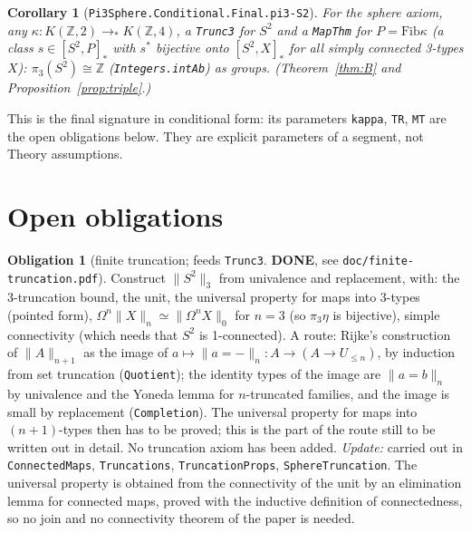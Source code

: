\documentclass[11pt]{amsart}
\newtheorem{corollary}[theorem]{Corollary}
\theoremstyle{definition}
\newtheorem{obligation}[theorem]{Obligation}
\theoremstyle{remark}
\newcommand{\Om}{\Omega}
\newcommand{\Fib}{\mathrm{Fib}}
\newcommand{\Z}{\mathbb{Z}}
\newcommand{\tr}[2]{\|#1\|_{#2}}
\newcommand{\hc}[2]{[#1,#2]_*}
\newcommand{\code}[1]{\texttt{#1}}
\begin{document}
\begin{corollary}[\code{Pi3Sphere.Conditional.Final.pi3-S2}]
For the sphere axiom, any $\kappa:K(\Z,2)\to_*K(\Z,4)$, a \code{Trunc3}
for $S^2$ and a \code{MapThm} for $P=\Fib\kappa$ (a class
$s\in\hc{S^2}P$ with $s^*$ bijective onto $\hc{S^2}X$ for all simply
connected 3-types $X$): $\pi_3(S^2)\cong\Z$ (\code{Integers.intAb}) as
groups. (Theorem~\ref{thm:B} and Proposition~\ref{prop:triple}.)
\end{corollary}

This is the final signature in conditional form: its parameters
\code{kappa}, \code{TR}, \code{MT} are the open obligations below. They
are explicit parameters of a segment, not Theory assumptions.

\section{Open obligations}\label{sec:open}

\begin{obligation}[finite truncation; feeds \code{Trunc3}. \textbf{DONE}, see \code{doc/finite-truncation.pdf}]
Construct $\tr{S^2}3$ from univalence and replacement, with: the
3-truncation bound, the unit, the universal property for maps into
3-types (pointed form), $\Om^n\tr X{n}\simeq\tr{\Om^nX}0$ for $n=3$ (so
$\pi_3\eta$ is bijective), simple connectivity (which needs that $S^2$ is
1-connected). A route: Rijke's construction of $\tr A{n+1}$ as the image of
$a\mapsto\tr{a=-}n:A\to(A\to U_{\le n})$, by induction from set
truncation (\code{Quotient}); the identity types of the image are
$\tr{a=b}n$ by univalence and the Yoneda lemma for $n$-truncated
families, and the image is small by replacement (\code{Completion}). The
universal property for maps into $(n+1)$-types then has to be proved;
this is the part of the route still to be written out in detail. No
truncation axiom has been added. \emph{Update:} carried out in
\code{ConnectedMaps}, \code{Truncations}, \code{TruncationProps},
\code{SphereTruncation}. The universal property is obtained from the
connectivity of the unit by an elimination lemma for connected maps,
proved with the inductive definition of connectedness, so no join and no
connectivity theorem of the paper is needed.
\end{obligation}
\end{document}
